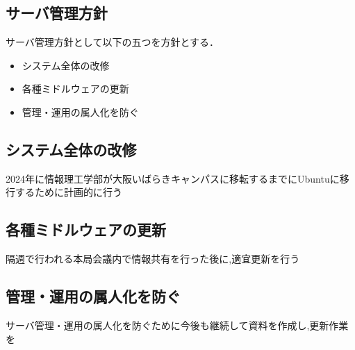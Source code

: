 \subsection*{サーバ管理方針}


サーバ管理方針として以下の五つを方針とする．
\begin{itemize}
    \item システム全体の改修
    \item 各種ミドルウェアの更新
    \item 管理・運用の属人化を防ぐ
\end{itemize}

\subsection*{システム全体の改修}
2024年に情報理工学部が大阪いばらきキャンパスに移転するまでにUbuntuに移行するために計画的に行う

\subsection*{各種ミドルウェアの更新}
隔週で行われる本局会議内で情報共有を行った後に,適宜更新を行う

\subsection*{管理・運用の属人化を防ぐ}
サーバ管理・運用の属人化を防ぐために今後も継続して資料を作成し,更新作業を